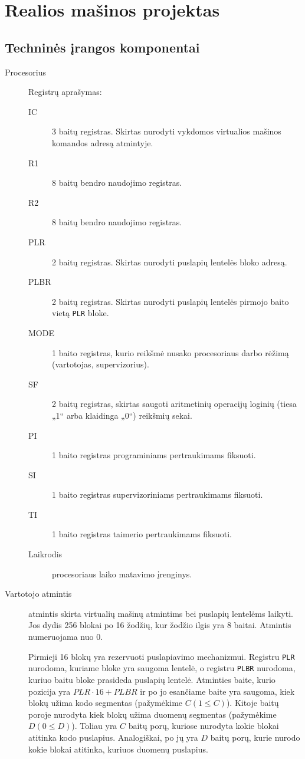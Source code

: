 \section{Realios mašinos projektas}

\subsection{Techninės įrangos komponentai}

\begin{description}
  \item[Procesorius] Registrų aprašymas:
    \begin{description}
      \item[IC] 3 baitų registras. Skirtas nurodyti vykdomos virtualios
        mašinos komandos adresą atmintyje.
      \item[R1] 8 baitų bendro naudojimo registras.
      \item[R2] 8 baitų bendro naudojimo registras.
      \item[PLR] 2 baitų registras. Skirtas nurodyti puslapių lentelės 
        bloko adresą.
      \item[PLBR] 2 baitų registras. Skirtas nurodyti puslapių lentelės
        pirmojo baito vietą \verb|PLR| bloke.
      \item[MODE] 1 baito registras, kurio reikšmė nusako procesoriaus
        darbo rėžimą (vartotojas, supervizorius).
      \item[SF] 2 baitų registras, skirtas saugoti aritmetinių operacijų 
        loginių (tiesa „1“ arba klaidinga „0“) reikšmių sekai.
      \item[PI] 1 baito registras programiniams pertraukimams fiksuoti.
      \item[SI] 1 baito registras supervizoriniams pertraukimams fiksuoti.
      \item[TI] 1 baito registras taimerio pertraukimams fiksuoti.
      \item[Laikrodis] procesoriaus laiko matavimo įrenginys.
    \end{description}
  \item[Vartotojo atmintis] atmintis skirta virtualių mašinų atmintims bei 
    puslapių lentelėms laikyti. Jos dydis 256 blokai po 16 žodžių, kur
    žodžio ilgis yra 8 baitai. Atmintis numeruojama nuo 0. 

    Pirmieji 16 blokų yra rezervuoti puslapiavimo mechanizmui. Registru
    \verb|PLR| nurodoma, kuriame bloke yra saugoma lentelė, o registru
    \verb|PLBR| nurodoma, kuriuo baitu bloke prasideda puslapių lentelė.
    Atminties baite, kurio pozicija yra $PLR \cdot 16 + PLBR$ ir po jo 
    esančiame baite yra saugoma, kiek blokų užima kodo segmentas 
    (pažymėkime $C (1 \leq C)$). Kitoje baitų poroje nurodyta kiek blokų 
    užima duomenų segmentas (pažymėkime $D (0 \leq D)$). Toliau yra 
    $C$ baitų porų, kuriose nurodyta kokie blokai atitinka kodo puslapius.
    Analogiškai, po jų yra $D$ baitų porų, kurie nurodo kokie blokai 
    atitinka, kuriuos duomenų puslapius.


\end{description}
